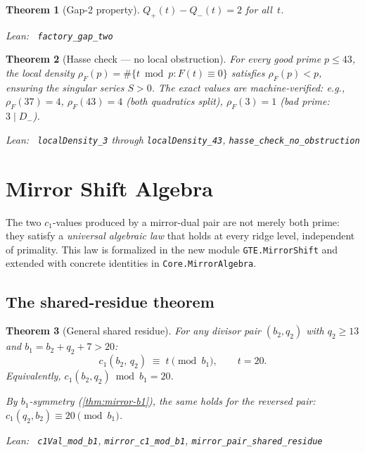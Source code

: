 \documentclass[11pt,a4paper]{article}
\newenvironment{leanref}%
  {\par\smallskip\noindent\begingroup\raggedright\textup{Lean:}~}%
  {\par\endgroup}
\newtheorem{theorem}{Theorem}[section]
\theoremstyle{definition}
\begin{document}
\begin{theorem}[Gap-2 property]\label{thm:gap2}
$Q_+(t) - Q_-(t) = 2$ for all~$t$.

\begin{leanref} \lstinline|factory_gap_two|
\end{leanref}
\end{theorem}

\begin{theorem}[Hasse check --- no local obstruction]\label{thm:hasse}
For every good prime $p \le 43$, the local density
$\rho_F(p) = \#\{t \bmod p : F(t) \equiv 0\}$ satisfies
$\rho_F(p) < p$, ensuring the singular series $S > 0$.  The exact
values are machine-verified: e.g.,
$\rho_F(37) = 4$, $\rho_F(43) = 4$ (both quadratics split),
$\rho_F(3) = 1$ (bad prime: $3 \mid D_-$).

\begin{leanref} \lstinline|localDensity_3| through \lstinline|localDensity_43|,
\lstinline|hasse_check_no_obstruction|
\end{leanref}
\end{theorem}

\section{Mirror Shift Algebra}\label{sec:mirrorshift}

The two $c_1$-values produced by a mirror-dual pair are not merely
both prime: they satisfy a \emph{universal algebraic law} that holds
at every ridge level, independent of primality.
This law is formalized in the new module \texttt{GTE.MirrorShift}
and extended with concrete identities in \texttt{Core.MirrorAlgebra}.

\subsection{The shared-residue theorem}

\begin{theorem}[General shared residue]\label{thm:shared-residue}
For any divisor pair $(b_2, q_2)$ with $q_2 \ge 13$ and
$b_1 = b_2 + q_2 + 7 > 20$:
\[
  c_1(b_2,\, q_2) \;\equiv\; t \pmod{b_1},
  \qquad t = 20.
\]
Equivalently, $c_1(b_2, q_2) \bmod b_1 = 20$.

By $b_1$-symmetry (\cref{thm:mirror-b1}), the same holds for the
reversed pair: $c_1(q_2, b_2) \equiv 20 \pmod{b_1}$.

\begin{leanref} \lstinline|c1Val_mod_b1|, \lstinline|mirror_c1_mod_b1|,
\lstinline|mirror_pair_shared_residue|
\end{leanref}
\end{theorem}
\end{document}
